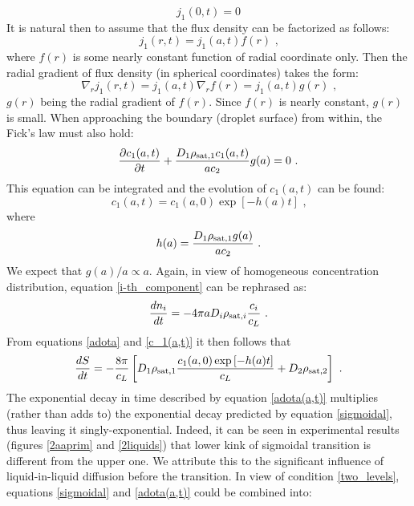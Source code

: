 \documentclass[twoside,twocolumn,9pt]{article}
\begin{document}
\begin{equation}
j_1(0,t)=0 
\end{equation}
It is natural then to assume that the flux density can be factorized as follows:
\begin{equation}
j_1(r,t) = j_1(a,t) f(r) \mbox{ ,}
\end{equation}
where $f(r)$ is some nearly constant function of radial coordinate only. Then the radial gradient of flux density (in spherical coordinates) takes the form:
\begin{equation}
\nabla _r j_1(r,t) = j_1(a,t) \nabla _r f(r) = j_1(a,t) g(r) \mbox{ ,}
\end{equation}
$g(r)$ being the radial gradient of $f(r)$. Since $f(r)$ is nearly constant, $g(r)$ is small. When approaching the boundary (droplet surface) from within, the Fick's law must also hold:
\begin{equation}
\frac{\partial c_1(a,t)}{\partial t} + \frac{D_1 \rho_{{\rm sat},1} c_1(a,t)}{a c_2} g(a) = 0 \mbox{ .}
\end{equation}
This equation can be integrated and the evolution of $c_1(a,t)$ can be found:
\begin{equation}
c_1(a,t) = c_1(a,0) \exp \left[ -h(a)t \right] \mbox{ ,}
\label{c_1(a,t)}
\end{equation}
where 
\begin{equation*}
h(a) = \frac{D_1 \rho_{{\rm sat},1} g(a)}{a c_2} \mbox{ .}
\end{equation*}
We expect that $g(a)/a\propto a$. Again, in view of homogeneous concentration distribution, equation \ref{i-th_component} can be rephrased as:
\begin{equation}
\frac{dn_i}{dt} = -4\pi a D_i\rho_{{\rm sat},i} \frac{c_i}{c_L} \mbox{~.}
\end{equation}
From equations \ref{adota} and \ref{c_1(a,t)} it then follows that
\begin{equation}
\frac{dS}{dt} = -\frac{8\pi}{c_L} \left[ D_1\rho_{{\rm sat},1} \frac{c_1(a,0) \exp \left[ -h(a)t \right]}{c_L} + D_2\rho_{{\rm sat},2} \right] \mbox{ .}
\label{adota(a,t)}
\end{equation}
The exponential decay in time described by equation \ref{adota(a,t)} multiplies (rather than adds to) the exponential decay predicted by equation \ref{sigmoidal}, thus leaving it singly-exponential. Indeed, it can be seen in experimental results (figures \ref{2aaprim} and \ref{2liquids}) that lower kink of sigmoidal transition is different from the upper one. We attribute this to the significant influence of liquid-in-liquid diffusion before the transition. In view of condition \ref{two_levels}, equations \ref{sigmoidal} and \ref{adota(a,t)} could be combined into:
\end{document}
